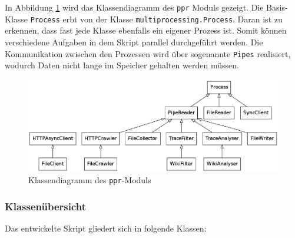 In Abbildung \ref{fig:classes} wird das Klassendiagramm des \texttt{ppr} Moduls gezeigt. Die Basis-Klasse \texttt{Process} erbt von der Klasse \texttt{multiprocessing.Process}. Daran ist zu erkennen, dass fast jede Klasse ebenfalls ein eigener Prozess ist. Somit können verschiedene Aufgaben in dem Skript parallel durchgeführt werden. Die Kommunikation zwischen den Prozessen wird über sogenannte \texttt{Pipes} realisiert, wodurch Daten nicht lange im Speicher gehalten werden müssen.

\begin{figure}
  \centering
  \includegraphics[width=\textwidth]{images/classes.png}
  \caption{Klassendiagramm des \texttt{ppr}-Moduls}
  \label{fig:classes}
\end{figure}

\subsubsection{Klassenübersicht}
\label{sec:klassen}

Das entwickelte Skript gliedert sich in folgende Klassen:


